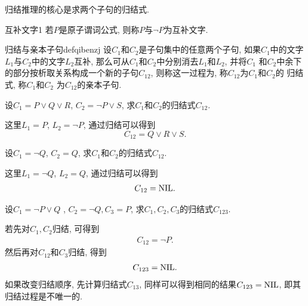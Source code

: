归结推理的核心是求两个子句的归结式.
\begin{mydef}{互补文字}{1}
    若$P$是原子谓词公式, 则称$P$与$\neg P$为互补文字.
\end{mydef}
\begin{mydef}{归结与亲本子句}{defqibenzj}
    设$C_1$和$C_2$是子句集中的任意两个子句, 如果$C_1$中的文字$L_1$与$C_2$中的文字$L_2$互补, 那么可从$C_1$和$C_2$中分别消去$L_1$和$L_2$, 并将$C_1$ 和$C_2$中余下的部分按析取关系构成一个新的子句$C_{12}$, 则称这一过程为, 称$C_{12}$为$C_1$和$C_2$的
   归结式, 称$C_1$和$C_2$ 为$C_{1 2}$的亲本子句.
\end{mydef}
\begin{example}
    设$C_1 =P\vee Q\vee R$, $C_2=\neg P\vee S$, 求$C_1$和$C_2$的归结式$C_{12}$.
\end{example}
\begin{result}
这里$L_1=P$, $L_2=\neg P$, 通过归结可以得到
             $$C_{12}= Q\vee R\vee S.$$
\begin{example}
  设$C_1=\neg Q$, $C_2=Q$, 求$C_1$和$C_2$的归结式$C_{12}$.
\end{example}
\end{result}
\begin{result}
    这里$L_1=\neg Q$, $L_2=Q$, 通过归结可以得到
\begin{align}
    C_{12}= \textup{NIL}.
\end{align}
\end{result}
\begin{example}
    设$C_1  =\neg P \vee  Q$ , $C_2 =\neg Q,C_3=P$, 求$C_1,C_2 ,C_3$的归结式$C_{123}$.
\end{example}
\begin{result}
若先对$C_1,C_2$归结, 可得到
\begin{align}
    C_{1 2}=\neg P.
\end{align}
然后再对$C_{12}$和$C_3$归结, 得到
\begin{align}
    C_{123}=\textup{NIL}.
\end{align}
如果改变归结顺序, 先计算归结式$C_{13}$, 同样可以得到相同的结果$C_{123}=\textup{NIL}$, 即其归结过程是不唯一的.
\end{result}
